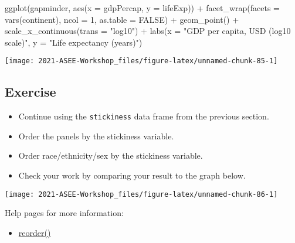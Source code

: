 \documentclass[
]{book}
\newenvironment{Shaded}{\begin{snugshade}}{\end{snugshade}}
\newcommand{\AttributeTok}[1]{\textcolor[rgb]{0.77,0.63,0.00}{#1}}
\newcommand{\ConstantTok}[1]{\textcolor[rgb]{0.00,0.00,0.00}{#1}}
\newcommand{\DecValTok}[1]{\textcolor[rgb]{0.00,0.00,0.81}{#1}}
\newcommand{\FunctionTok}[1]{\textcolor[rgb]{0.00,0.00,0.00}{#1}}
\newcommand{\NormalTok}[1]{#1}
\newcommand{\SpecialCharTok}[1]{\textcolor[rgb]{0.00,0.00,0.00}{#1}}
\newcommand{\StringTok}[1]{\textcolor[rgb]{0.31,0.60,0.02}{#1}}
\providecommand{\tightlist}{%
  \setlength{\itemsep}{0pt}\setlength{\parskip}{0pt}}
\begin{document}
\begin{Shaded}
\begin{Highlighting}[]
\FunctionTok{ggplot}\NormalTok{(gapminder, }\FunctionTok{aes}\NormalTok{(}\AttributeTok{x =}\NormalTok{ gdpPercap, }\AttributeTok{y =}\NormalTok{ lifeExp)) }\SpecialCharTok{+}
  \FunctionTok{facet\_wrap}\NormalTok{(}\AttributeTok{facets =} \FunctionTok{vars}\NormalTok{(continent), }\AttributeTok{ncol =} \DecValTok{1}\NormalTok{, }\AttributeTok{as.table =} \ConstantTok{FALSE}\NormalTok{) }\SpecialCharTok{+}
  \FunctionTok{geom\_point}\NormalTok{() }\SpecialCharTok{+}
  \FunctionTok{scale\_x\_continuous}\NormalTok{(}\AttributeTok{trans =} \StringTok{"log10"}\NormalTok{) }\SpecialCharTok{+}
  \FunctionTok{labs}\NormalTok{(}\AttributeTok{x =} \StringTok{"GDP per capita, USD (log10 scale)"}\NormalTok{, }
       \AttributeTok{y =} \StringTok{"Life expectancy (years)"}\NormalTok{) }
\end{Highlighting}
\end{Shaded}

\texttt{[image: 2021-ASEE-Workshop\_files/figure-latex/unnamed-chunk-85-1]}

\hypertarget{exercise-6}{%
\subsection{Exercise}\label{exercise-6}}

\begin{itemize}
\tightlist
\item
  Continue using the \texttt{stickiness} data frame from the previous section.\\
\item
  Order the panels by the stickiness variable.
\item
  Order race/ethnicity/sex by the stickiness variable.
\item
  Check your work by comparing your result to the graph below.
\end{itemize}

\texttt{[image: 2021-ASEE-Workshop\_files/figure-latex/unnamed-chunk-86-1]}

Help pages for more information:

\begin{itemize}
\tightlist
\item
  \href{https://www.rdocumentation.org/packages/stats/versions/3.6.2/topics/reorder.default}{reorder()}
\end{itemize}
\end{document}
